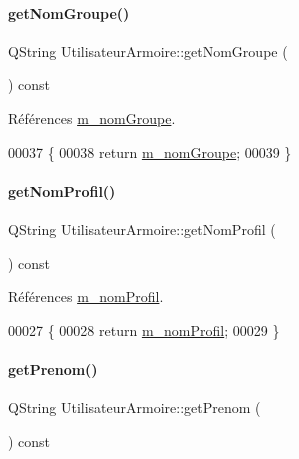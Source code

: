 \paragraph{\texorpdfstring{get\+Nom\+Groupe()}{getNomGroupe()}}
{\footnotesize\ttfamily Q\+String Utilisateur\+Armoire\+::get\+Nom\+Groupe (\begin{DoxyParamCaption}{ }\end{DoxyParamCaption}) const}



Références \hyperlink{class_utilisateur_armoire_a6cf08d0dafdc9111d34f34a47c78b373}{m\+\_\+nom\+Groupe}.


\begin{DoxyCode}
00037 \{
00038     \textcolor{keywordflow}{return} \hyperlink{class_utilisateur_armoire_a6cf08d0dafdc9111d34f34a47c78b373}{m\_nomGroupe};
00039 \}
\end{DoxyCode}
\mbox{\label{class_utilisateur_armoire_a7ab03056bcfa00c2278488f5a381ac18}} 
\paragraph{\texorpdfstring{get\+Nom\+Profil()}{getNomProfil()}}
{\footnotesize\ttfamily Q\+String Utilisateur\+Armoire\+::get\+Nom\+Profil (\begin{DoxyParamCaption}{ }\end{DoxyParamCaption}) const}



Références \hyperlink{class_utilisateur_armoire_a470f47c105d9b3124c8d284b164a443d}{m\+\_\+nom\+Profil}.


\begin{DoxyCode}
00027 \{
00028     \textcolor{keywordflow}{return} \hyperlink{class_utilisateur_armoire_a470f47c105d9b3124c8d284b164a443d}{m\_nomProfil};
00029 \}
\end{DoxyCode}
\mbox{\label{class_utilisateur_armoire_a000f0cfe0e184a298c74a5eddc39bee7}} 
\paragraph{\texorpdfstring{get\+Prenom()}{getPrenom()}}
{\footnotesize\ttfamily Q\+String Utilisateur\+Armoire\+::get\+Prenom (\begin{DoxyParamCaption}{ }\end{DoxyParamCaption}) const}



